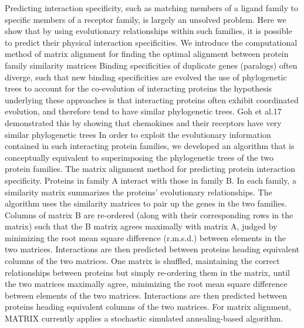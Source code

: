 Predicting interaction specificity, such as matching members of a ligand family to specific members of a receptor family, is largely an unsolved problem. Here we show that by using evolutionary relationships within such families, it is possible to predict their physical interaction specificities.  \cite{ramani2003exploiting}
We introduce the computational method of matrix alignment for finding the optimal alignment between protein family similarity matrices \cite{ramani2003exploiting}
Binding specificities of duplicate genes (paralogs) often diverge, such that new binding specificities are evolved \cite{ramani2003exploiting}
the use of phylogenetic trees to account for the co-evolution of interacting proteins \cite{ramani2003exploiting}
the hypothesis underlying these approaches is that interacting proteins often exhibit coordinated evolution, and therefore tend to have similar phylogenetic trees. Goh et al.17 demonstrated this by showing that chemokines and their receptors have very similar phylogenetic trees \cite{ramani2003exploiting}
In order to exploit the evolutionary information contained in such interacting protein families, we developed an algorithm that is conceptually equivalent to superimposing the phylogenetic trees of the two protein families. \cite{ramani2003exploiting}
The matrix alignment method for predicting protein interaction specificity. Proteins in family A interact with those in family B. In each family, a similarity matrix summarizes the proteins' evolutionary relationships. The algorithm uses the similarity matrices to pair up the genes in the two families. Columns of matrix B are re-ordered (along with their corresponding rows in the matrix) such that the B matrix agrees maximally with matrix A, judged by minimizing the root mean square difference (r.m.s.d.) between elements in the two matrices. Interactions are then predicted between proteins heading equivalent columns of the two matrices. \cite{ramani2003exploiting}
One matrix is shuffled, maintaining the correct relationships between proteins but simply re-ordering them in the matrix, until the two matrices maximally agree, minimizing the root mean square difference between elements of the two matrices. Interactions are then predicted between proteins heading equivalent columns of the two matrices.  \cite{ramani2003exploiting}
For matrix alignment, MATRIX currently applies a stochastic simulated annealing-based algorithm. \cite{ramani2003exploiting}

